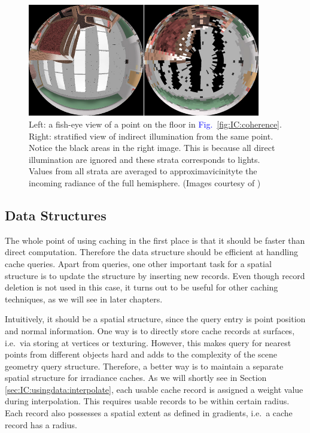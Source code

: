 \documentclass[]{book}
\renewcommand{\figurename}{\textcolor{blue}{Fig.\ }}
\begin{document}
\begin{figure}
	\centering
	\includegraphics[width=4.0in]{img/IC-hemisphere.png}
	\caption[Irradiance Cache Data]{Left: a fish-eye view of a point on the floor in \figurename \ref{fig:IC:coherence}. Right: stratified view of indirect illumination from the same point. Notice the black areas in the right image. This is because all direct illumination are ignored and these strata corresponds to lights. Values from all strata are averaged to approximavicinityte the incoming radiance of the full hemisphere. (Images courtesy of \citeauthor{ward1988IC})}
	\label{fig:IC:hemisphere}
\end{figure}

\subsection{Data Structures}
\label{sec:IC:data:structure}
The whole point of using caching in the first place is that it should be faster than direct computation.
Therefore the data structure should be efficient at handling cache queries.
Apart from queries, one other important task for a spatial structure is to update the structure by inserting new records.
Even though record deletion is not used in this case, it turns out to be useful for other caching techniques, as we will see in later chapters.

Intuitively, it should be a spatial structure, since the query entry is point position and normal information.
One way is to directly store cache records at surfaces, i.e.\ via storing at vertices or texturing.
However, this makes query for nearest points from different objects hard and adds to the complexity of the scene geometry query structure.
Therefore, a better way is to maintain a separate spatial structure for irradiance caches.
As we will shortly see in Section \ref{sec:IC:usingdata:interpolate}, each usable cache record is assigned a weight value during interpolation.
This requires usable records to be within certain radius.
Each record also possesses a spatial extent as defined in gradients, i.e.\ a cache record has a radius.
\end{document}

